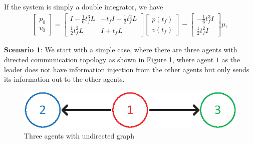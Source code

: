 \documentclass[12pt,draftcls,onecolumn]{IEEEtran}  %
\begin{document}
\begin{Rmk}
If the system is simply a double integrator, we have 
\begin{align*}
\begin{bmatrix}
p_0\\
v_0
\end{bmatrix}=\begin{bmatrix}
I-\frac{1}{6}t_f^3L&-t_fI-\frac{1}{2}t_f^2L\\
\frac{1}{2}t_f^2L&I+t_fL
\end{bmatrix}
\begin{bmatrix}
p(t_f)\\
v(t_f)
\end{bmatrix}-\begin{bmatrix}
-\frac{1}{6}t_f^3I\\ \frac{1}{2}t_f^2I
\end{bmatrix}\mu,
\end{align*}
\end{Rmk}




\textbf{Scenario 1}: We start with a simple case, where there are three agents with directed communication topology as shown in Figure \ref{Formation3directed}, where agent $1$ as the leader does not have information injection from the other agents but only sends its information out to the other agents.
\begin{figure}[h!]
      \centering
      \includegraphics[scale=0.9]{Formation3directed.eps}
      \caption{Three agents with undirected graph}\label{Formation3directed}
\end{figure}
\end{document}
